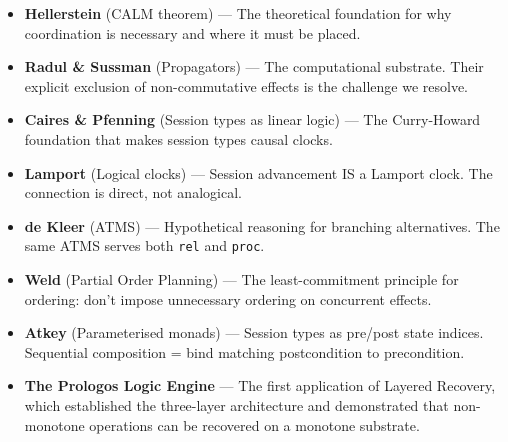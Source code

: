 \documentclass[11pt]{article}
\begin{document}
\begin{itemize}
\item \textbf{Hellerstein} (CALM theorem) --- The theoretical foundation for why
coordination is necessary and where it must be placed.
\item \textbf{Radul \& Sussman} (Propagators) --- The computational substrate. Their
explicit exclusion of non-commutative effects is the challenge we resolve.
\item \textbf{Caires \& Pfenning} (Session types as linear logic) --- The Curry-Howard
foundation that makes session types causal clocks.
\item \textbf{Lamport} (Logical clocks) --- Session advancement IS a Lamport clock.
The connection is direct, not analogical.
\item \textbf{de Kleer} (ATMS) --- Hypothetical reasoning for branching alternatives.
The same ATMS serves both \texttt{rel} and \texttt{proc}.
\item \textbf{Weld} (Partial Order Planning) --- The least-commitment principle for
ordering: don't impose unnecessary ordering on concurrent effects.
\item \textbf{Atkey} (Parameterised monads) --- Session types as pre/post state indices.
Sequential composition = bind matching postcondition to precondition.
\item \textbf{The Prologos Logic Engine} --- The first application of Layered Recovery,
which established the three-layer architecture and demonstrated that
non-monotone operations can be recovered on a monotone substrate.
\end{itemize}
\end{document}
